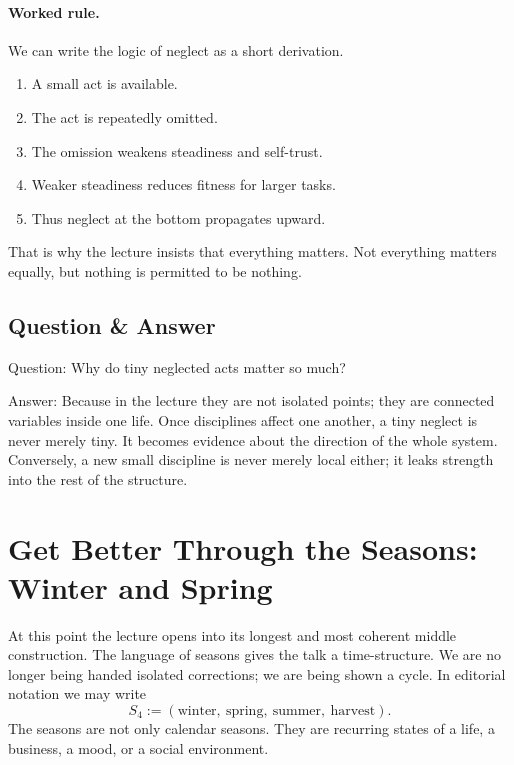 \paragraph{Worked rule.}
We can write the logic of neglect as a short derivation.
\begin{enumerate}
\item A small act is available.
\item The act is repeatedly omitted.
\item The omission weakens steadiness and self-trust.
\item Weaker steadiness reduces fitness for larger tasks.
\item Thus neglect at the bottom propagates upward.
\end{enumerate}
That is why the lecture insists that everything matters. Not everything matters equally, but nothing is permitted to be nothing.

\subsection{Question \& Answer}

Question: Why do tiny neglected acts matter so much?

Answer: Because in the lecture they are not isolated points; they are connected variables inside one life. Once disciplines affect one another, a tiny neglect is never merely tiny. It becomes evidence about the direction of the whole system. Conversely, a new small discipline is never merely local either; it leaks strength into the rest of the structure.

\section{Get Better Through the Seasons: Winter and Spring}

At this point the lecture opens into its longest and most coherent middle construction. The language of seasons gives the talk a time-structure. We are no longer being handed isolated corrections; we are being shown a cycle. In editorial notation we may write
\begin{equation}
S_4 := (\text{winter},\ \text{spring},\ \text{summer},\ \text{harvest}).
\end{equation}
The seasons are not only calendar seasons. They are recurring states of a life, a business, a mood, or a social environment.

